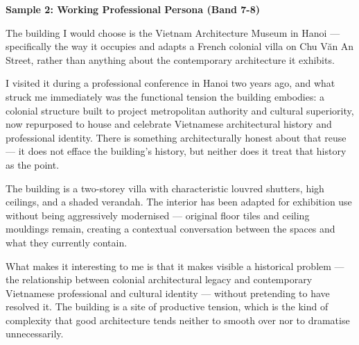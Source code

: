 \begin{ieltsanswer}
\textbf{Sample 2: Working Professional Persona (Band 7-8)}

The building I would choose is the Vietnam Architecture Museum in Hanoi — specifically the way it occupies and adapts a French colonial villa on Chu Văn An Street, rather than anything about the contemporary architecture it exhibits.

I visited it during a professional conference in Hanoi two years ago, and what struck me immediately was the functional tension the building embodies: a colonial structure built to project metropolitan authority and cultural superiority, now repurposed to house and celebrate Vietnamese architectural history and professional identity. There is something architecturally honest about that reuse — it does not efface the building's history, but neither does it treat that history as the point.

The building is a two-storey villa with characteristic louvred shutters, high ceilings, and a shaded verandah. The interior has been adapted for exhibition use without being aggressively modernised — original floor tiles and ceiling mouldings remain, creating a contextual conversation between the spaces and what they currently contain.

What makes it interesting to me is that it makes visible a historical problem — the relationship between colonial architectural legacy and contemporary Vietnamese professional and cultural identity — without pretending to have resolved it. The building is a site of productive tension, which is the kind of complexity that good architecture tends neither to smooth over nor to dramatise unnecessarily.
\end{ieltsanswer}


